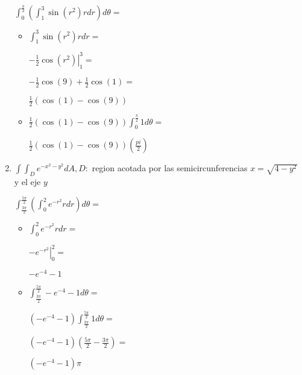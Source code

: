 \documentclass[../practica_09.tex]{subfiles}
\begin{document}
\begin{enumerate}
            $\int_0^{\frac{\pi}{2}} (\int_1^3 \sin(r^2) r dr) d\theta = $

            \begin{itemize}
                \item $\int_1^3 \sin(r^2) r dr = $
                
                    $\left. - \frac{1}{2}\cos(r^2) \right |_1^3 = $

                    $ -\frac{1}{2}\cos(9) + \frac{1}{2}\cos(1) =  $

                    $ \frac{1}{2}(\cos(1)- \cos(9)) $

                \item $\frac{1}{2}(\cos(1)- \cos(9)) \int_0^{\frac{\pi}{2}} 1 d\theta = $

                    $ \frac{1}{2}(\cos(1)- \cos(9)) (\frac{pi}{2})$

            \end{itemize}
        
        \item $\int\int_D e^{-x^2-y^2} dA, D:$ region acotada por las semicircunferencias $x=\sqrt{4-y^2}$ y el eje $y$
        
            $\int_{\frac{3\pi}{2}}^{\frac{5\pi}{2}} (\int_0^2 e^{-r^2} r dr) d\theta = $

            \begin{itemize}
                \item $\int_0^2 e^{-r^2} r dr = $
                
                    $ \left. -e^{-r^2} \right |_0^2 = $

                    $ -e^{-4} - 1 $

                \item $\int_{\frac{3\pi}{2}}^{\frac{5\pi}{2}} -e^{-4} - 1 d\theta = $
                
                    $ (-e^{-4} - 1) \int_{\frac{3\pi}{2}}^{\frac{5\pi}{2}} 1 d\theta = $

                    $ (-e^{-4} - 1)(\frac{5\pi}{2}- \frac{3\pi}{2} ) = $

                    $(-e^{-4} - 1)\pi$

            \end{itemize}

    \end{enumerate}
\end{document}
